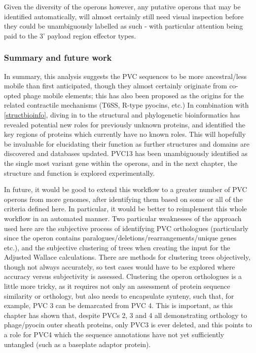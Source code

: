 Given the diversity of the operons however, any putative operons that may be identified automatically, will almost certainly still need visual inspection before they could be unambiguously labelled as such - with particular attention being paid to the 3' payload region effector types.
\newline


\subsubsection{Summary and future work}
In summary, this analysis suggests the PVC sequences to be more ancestral/less mobile than first anticipated, though they almost certainly originate from co-opted phage mobile elements; this has also been proposed as the origins for the related contractile mechanisms (T6SS, R-type pyocins, etc.) In combination with \vref{structbioinfo}, diving in to the structural and phylogenetic bioinformatics has revealed potential new roles for previously unknown proteins, and identified the key regions of proteins which currently have no known roles. This will hopefully be invaluable for elucidating their function as further structures and domains are discovered and databases updated. PVC13 has been unambiguously identified as the single most variant gene within the operons, and in the next chapter, the structure and function is explored experimentally.

In future, it would be good to extend this workflow to a greater number of PVC operons from more genomes, after identifying them based on some or all of the criteria defined here. In particular, it would be better to reimplement this whole workflow in an automated manner. Two particular weaknesses of the approach used here are the subjective process of identifying PVC orthologues (particularly since the operon contains paralogues/deletions/rearrangements/unique genes etc.), and the subjective clustering of trees when creating the input for the Adjusted Wallace calculations. There are methods for clustering trees objectively, though not always accurately, so test cases would have to be explored where accuracy versus subjectivity is assessed. Clustering the operon orthologues is a little more tricky, as it requires not only an assessment of protein sequence similarity or orthology, but also needs to encapsulate synteny, such that, for example, PVC 3 can be demarcated from PVC 4. This is important, as this chapter has shown that, despite PVCs 2, 3 and 4 all demonstrating orthology to phage/pyocin outer sheath proteins, only PVC3 is ever deleted, and this points to a role for PVC4 which the sequence annotations have not yet sufficiently untangled (such as a baseplate adaptor protein). 

